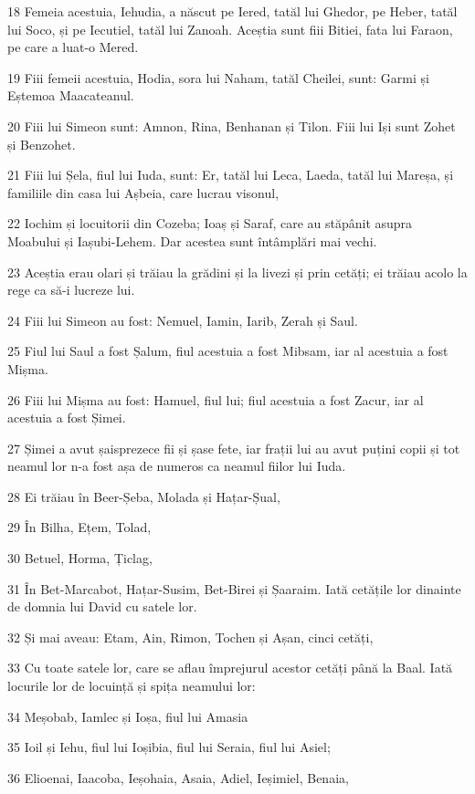 \par 18 Femeia acestuia, Iehudia, a născut pe Iered, tatăl lui Ghedor, pe Heber, tatăl lui Soco, și pe Iecutiel, tatăl lui Zanoah. Aceștia sunt fiii Bitiei, fata lui Faraon, pe care a luat-o Mered.
\par 19 Fiii femeii acestuia, Hodia, sora lui Naham, tatăl Cheilei, sunt: Garmi și Eștemoa Maacateanul.
\par 20 Fiii lui Simeon sunt: Amnon, Rina, Benhanan și Tilon. Fiii lui Iși sunt Zohet și Benzohet.
\par 21 Fiii lui Șela, fiul lui Iuda, sunt: Er, tatăl lui Leca, Laeda, tatăl lui Mareșa, și familiile din casa lui Așbeia, care lucrau visonul,
\par 22 Iochim și locuitorii din Cozeba; Ioaș și Saraf, care au stăpânit asupra Moabului și Iașubi-Lehem. Dar acestea sunt întâmplări mai vechi.
\par 23 Aceștia erau olari și trăiau la grădini și la livezi și prin cetăți; ei trăiau acolo la rege ca să-i lucreze lui.
\par 24 Fiii lui Simeon au fost: Nemuel, Iamin, Iarib, Zerah și Saul.
\par 25 Fiul lui Saul a fost Șalum, fiul acestuia a fost Mibsam, iar al acestuia a fost Mișma.
\par 26 Fiii lui Mișma au fost: Hamuel, fiul lui; fiul acestuia a fost Zacur, iar al acestuia a fost Șimei.
\par 27 Șimei a avut șaisprezece fii și șase fete, iar frații lui au avut puțini copii și tot neamul lor n-a fost așa de numeros ca neamul fiilor lui Iuda.
\par 28 Ei trăiau în Beer-Șeba, Molada și Hațar-Șual,
\par 29 În Bilha, Ețem, Tolad,
\par 30 Betuel, Horma, Țiclag,
\par 31 În Bet-Marcabot, Hațar-Susim, Bet-Birei și Șaaraim. Iată cetățile lor dinainte de domnia lui David cu satele lor.
\par 32 Și mai aveau: Etam, Ain, Rimon, Tochen și Așan, cinci cetăți,
\par 33 Cu toate satele lor, care se aflau împrejurul acestor cetăți până la Baal. Iată locurile lor de locuință și spița neamului lor:
\par 34 Meșobab, Iamlec și Ioșa, fiul lui Amasia
\par 35 Ioil și Iehu, fiul lui Ioșibia, fiul lui Seraia, fiul lui Asiel;
\par 36 Elioenai, Iaacoba, Ieșohaia, Asaia, Adiel, Ieșimiel, Benaia,
